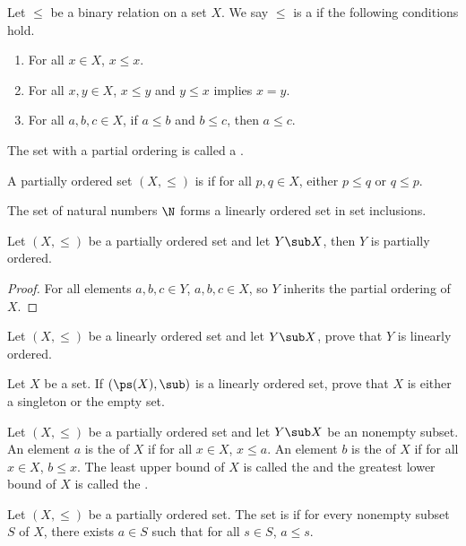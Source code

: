 \documentclass[10pt]{article}
\begin{document}
\begin{definition}
    Let $\le$ be a binary relation on a set $X$. We say $\le$ is a  if the following conditions hold.
    \begin{enumerate}
        \item For all $x\in X$, $x\le x$.
        \item For all $x,y\in X$, $x\le y$ and $y\le x$ implies $x=y$.
        \item For all $a,b,c\in X$, if $a\le b$ and $b\le c$, then $a\le c$.
    \end{enumerate}
    The set with a partial ordering is called a .
\end{definition}
\begin{definition}
    A partially ordered set $(X,\le)$ is  if for all $p,q\in X$, either $p\le q$ or $q\le p$.
\end{definition}
\begin{example}
    The set of natural numbers $\N$ forms a linearly ordered set in set inclusions.
\end{example}
\begin{proposition}
    Let $(X,\le)$ be a partially ordered set and let $Y\sub X$, then $Y$ is partially ordered.
\end{proposition}
\begin{proof}
    For all elements $a,b,c\in Y$, $a,b,c\in X$, so $Y$ inherits the partial ordering of $X$.
\end{proof}
\begin{problem}
    Let $(X,\le)$ be a linearly ordered set and let $Y\sub X$, prove that $Y$ is linearly ordered.
\end{problem}
\begin{problem}
    Let $X$ be a set. If $(\ps(X),\sub)$ is a linearly ordered set, prove that $X$ is either a singleton or the empty set.
\end{problem}
\begin{definition}
    Let $(X,\le)$ be a partially ordered set and let $Y\sub X$ be an nonempty subset. An element $a$ is the  of $X$ if for all $x\in X$, $x\le a$. An element $b$ is the  of $X$ if for all $x\in X$, $b\le x$. The least upper bound of $X$ is called the  and the greatest lower bound of $X$ is called the .
\end{definition}
\begin{definition}
    Let $(X,\le)$ be a partially ordered set. The set is  if for every nonempty subset $S$ of $X$, there exists $a\in S$ such that for all $s\in S$, $a\le s$.
\end{definition}
\end{document}
